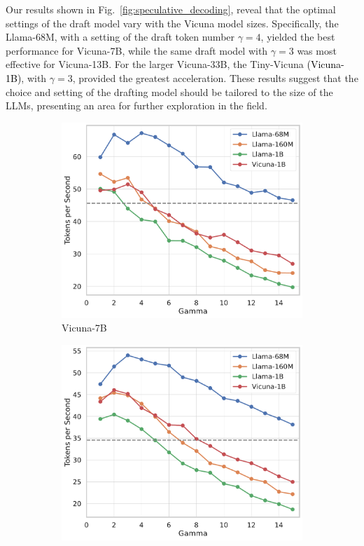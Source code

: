 \documentclass{article}
\theoremstyle{plain}
\theoremstyle{definition}
\theoremstyle{remark}
\begin{document}
Our results shown in Fig.~\ref{fig:speculative_decoding}, reveal that the optimal settings of the draft model vary with the Vicuna model sizes. Specifically, the Llama-68M, with a setting of the draft token number $\gamma=4$, yielded the best performance for Vicuna-7B, while the same draft model with $\gamma=3$ was most effective for Vicuna-13B. For the larger Vicuna-33B, the Tiny-Vicuna \textcolor{black}{(Vicuna-1B)}, with $\gamma=3$, provided the greatest acceleration. These results suggest that the choice and setting of the drafting model should be tailored to the size of the LLMs, presenting an area for further exploration in the field.



\begin{figure}[h]
     \centering
     \begin{subfigure}[b]{0.32\textwidth}
         \centering
         \includegraphics[width=\textwidth]{spec_7b.pdf}
         \caption{Vicuna-7B}
         \label{fig:spec7b}
     \end{subfigure}
     \begin{subfigure}[b]{0.32\textwidth}
         \centering
         \includegraphics[width=\textwidth]{spec_13b.pdf}

\end{subfigure}
\end{figure}
\end{document}
